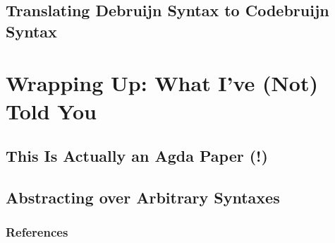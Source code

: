 \documentclass[aspectratio=169]{beamer}
\theoremstyle{remarkstyle}
\begin{document}
\subsection{Translating Debruijn Syntax to Codebruijn Syntax}


\section{Wrapping Up: What I've (Not) Told You}
\subsection{This Is Actually an Agda Paper (!)}
\subsection{Abstracting over Arbitrary Syntaxes}

\begin{frame}[fragile]
  \frametitle{References}
  \nocite{catsandtypes}
  \printbibliography{}
\end{frame}
\end{document}
